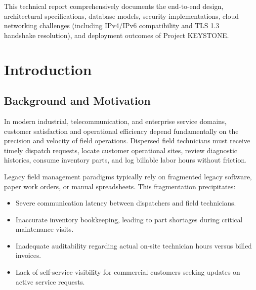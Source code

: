 \documentclass[12pt,a4paper,oneside]{report}
\begin{document}
This technical report comprehensively documents the end-to-end design, architectural specifications, database models, security implementations, cloud networking challenges (including IPv4/IPv6 compatibility and TLS 1.3 handshake resolution), and deployment outcomes of Project KEYSTONE.

\newpage
\tableofcontents
\listoffigures
\listoftables

\newpage
\chapter{Introduction}

\section{Background and Motivation}
In modern industrial, telecommunication, and enterprise service domains, customer satisfaction and operational efficiency depend fundamentally on the precision and velocity of field operations. Dispersed field technicians must receive timely dispatch requests, locate customer operational sites, review diagnostic histories, consume inventory parts, and log billable labor hours without friction. 

Legacy field management paradigms typically rely on fragmented legacy software, paper work orders, or manual spreadsheets. This fragmentation precipitates:
\begin{itemize}
    \item Severe communication latency between dispatchers and field technicians.
    \item Inaccurate inventory bookkeeping, leading to part shortages during critical maintenance visits.
    \item Inadequate auditability regarding actual on-site technician hours versus billed invoices.
    \item Lack of self-service visibility for commercial customers seeking updates on active service requests.
\end{itemize}
\end{document}
